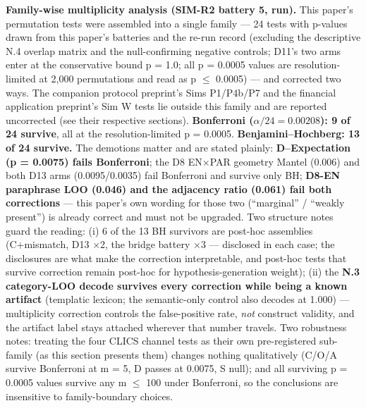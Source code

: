 \documentclass[11pt,twocolumn]{article}
\theoremstyle{plain}
\begin{document}
\textbf{Family-wise multiplicity analysis (SIM-R2 battery 5, run).} This paper's permutation tests were assembled into a single family --- 24 tests with p-values drawn from this paper's batteries and the re-run record (excluding the descriptive N.4 overlap matrix and the null-confirming negative controls; D11's two arms enter at the conservative bound p = 1.0; all p = 0.0005 values are resolution-limited at 2,000 permutations and read as p \(\leq\) 0.0005) --- and corrected two ways. The companion protocol preprint's Sims P1/P4b/P7 and the financial application preprint's Sim W tests lie outside this family and are reported uncorrected (see their respective sections). \textbf{Bonferroni (\(\alpha/24 = 0.00208\)): 9 of 24 survive}, all at the resolution-limited p = 0.0005. \textbf{Benjamini--Hochberg: 13 of 24 survive.} The demotions matter and are stated plainly: \textbf{D--Expectation (p = 0.0075) fails Bonferroni}; the D8 EN\(\times\)PAR geometry Mantel (0.006) and both D13 arms (0.0095/0.0035) fail Bonferroni and survive only BH; \textbf{D8-EN paraphrase LOO (0.046) and the adjacency ratio (0.061) fail both corrections} --- this paper's own wording for those two (``marginal'' / ``weakly present'') is already correct and must not be upgraded. Two structure notes guard the reading: (i) 6 of the 13 BH survivors are post-hoc assemblies (C+mismatch, D13 \(\times\)2, the bridge battery \(\times\)3 --- disclosed in each case; the disclosures are what make the correction interpretable, and post-hoc tests that survive correction remain post-hoc for hypothesis-generation weight); (ii) the \textbf{N.3 category-LOO decode survives every correction while being a known artifact} (templatic lexicon; the semantic-only control also decodes at 1.000) --- multiplicity correction controls the false-positive rate, \emph{not} construct validity, and the artifact label stays attached wherever that number travels. Two robustness notes: treating the four CLICS channel tests as their own pre-registered sub-family (as this section presents them) changes nothing qualitatively (C/O/A survive Bonferroni at m = 5, D passes at 0.0075, S null); and all surviving p = 0.0005 values survive any m \(\leq\) 100 under Bonferroni, so the conclusions are insensitive to family-boundary choices.
\end{document}
